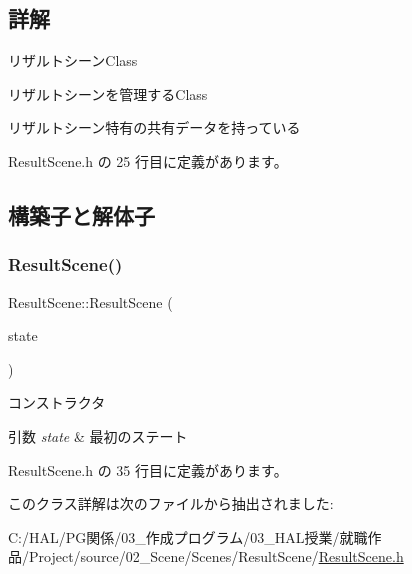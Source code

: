 \subsection{詳解}
リザルトシーン\+Class 

リザルトシーンを管理する\+Class

リザルトシーン特有の共有データを持っている 

 Result\+Scene.\+h の 25 行目に定義があります。



\subsection{構築子と解体子}
\mbox{\label{class_result_scene_ac184d41a92125eda200a132fe7aadd2e}} 
\subsubsection{\texorpdfstring{Result\+Scene()}{ResultScene()}}
{\footnotesize\ttfamily Result\+Scene\+::\+Result\+Scene (\begin{DoxyParamCaption}\item[{\mbox{\hyperlink{class_scene_base_1_1_state_base}{State\+Base}} $\ast$}]{state }\end{DoxyParamCaption})\hspace{0.3cm}{\ttfamily [inline]}}



コンストラクタ 


\begin{DoxyParams}{引数}
{\em state} & 最初のステート \\
\hline
\end{DoxyParams}


 Result\+Scene.\+h の 35 行目に定義があります。



このクラス詳解は次のファイルから抽出されました\+:\begin{DoxyCompactItemize}
\item 
C\+:/\+H\+A\+L/\+P\+G関係/03\+\_\+作成プログラム/03\+\_\+\+H\+A\+L授業/就職作品/\+Project/source/02\+\_\+\+Scene/\+Scenes/\+Result\+Scene/\mbox{\hyperlink{_result_scene_8h}{Result\+Scene.\+h}}\end{DoxyCompactItemize}
